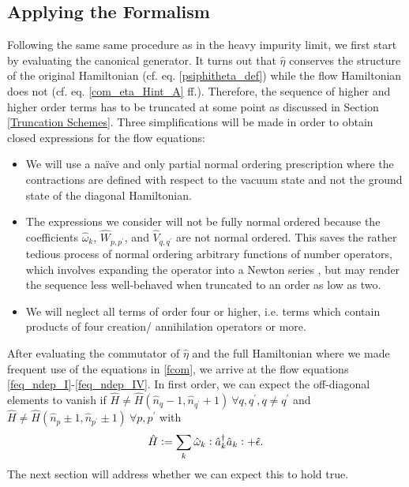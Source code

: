 \subsection{Applying the Formalism}
Following the same same procedure as in the heavy impurity limit, we first start by evaluating the canonical generator. It turns out that $\hat\eta$ conserves the structure of the original Hamiltonian (cf. eq. \ref{psiphitheta_def}) while the flow Hamiltonian does not (cf. eq. \ref{com_eta_Hint_A} ff.). Therefore, the sequence of higher and higher order terms has to be truncated at some point as discussed in Section \ref{Truncation Schemes}. 
Three simplifications will be made in order to obtain closed expressions for the flow equations:
\begin{itemize}
\item We will use a na\"ive and only partial normal ordering prescription where the contractions are defined with respect to the vacuum state and not the ground state of the diagonal Hamiltonian.
\item The expressions we consider will not be fully normal ordered because the coefficients $\hat\omega_k $, $\hat W_{p,p^\prime}$, and $\hat V_{q,q^\prime}$ are not normal ordered. This saves the rather tedious process of normal ordering arbitrary functions of number operators, which involves expanding the operator into a Newton series \cite{10.21468/SciPostPhys.10.1.007}, but may render the sequence less well-behaved when truncated to an order as low as two.
\item  We will neglect all terms of order four or higher, i.e. terms which contain products of four creation/ annihilation operators or more.
\end{itemize}
After evaluating the commutator of $\hat\eta$ and the full Hamiltonian where we made frequent use of the equations in \ref{fcom}, we arrive at the flow equations \ref{feq_ndep_I}-\ref{feq_ndep_IV}. In first order, we can expect the off-diagonal elements to vanish if $\hat H \neq \hat H(\hat n_q-1,\hat n_{q^\prime}+1)\ \forall q,q^\prime,q\neq q^\prime$ and $\hat H \neq \hat H(\hat n_p\pm 1,\hat n_{p^\prime}\pm 1)\ \forall p,p^\prime$ with \begin{equation}\hat H\vcentcolon= \sum\limits_k \hat\omega_k \vcentcolon\hat a^\dagger_k\hat a_k\vcentcolon+\hat\epsilon. \end{equation}
The next section will address whether we can expect this to hold true.



